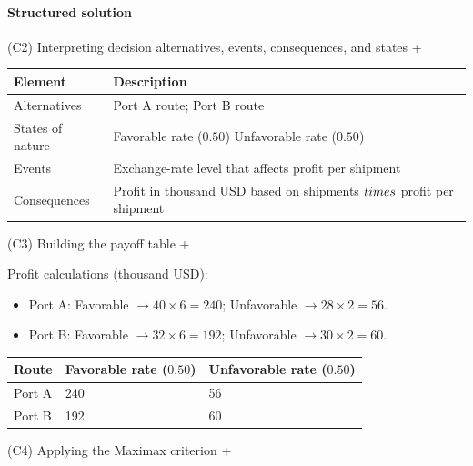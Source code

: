 \documentclass[11pt]{article}
\begin{document}
	\hypertarget{problem6-solution}{}
	
	\paragraph{Structured solution}
	
	
	(C2) Interpreting decision alternatives, events, consequences, and states
	+
	
	
	\begin{center}
		\begin{tabular}{ll}
			\toprule
			Element & Description \\
			\midrule
			Alternatives & Port A route; Port B route \\
			States of nature & Favorable rate
			($0.50$)
			Unfavorable rate
			($0.50$) \\
			Events & Exchange-rate level that affects profit per shipment \\
			Consequences & Profit in thousand USD based on shipments $\\times$ profit per shipment \\
			\bottomrule
		\end{tabular}
	\end{center}
	
	
	
	
	
	
	(C3) Building the payoff table
	+
	
	
	Profit calculations (thousand USD):
	\begin{itemize}
		\item Port A: Favorable $\to 40 \times 6 = 240$; Unfavorable $\to 28 \times 2 = 56$.
		\item Port B: Favorable $\to 32 \times 6 = 192$; Unfavorable $\to 30 \times 2 = 60$.
	\end{itemize}
	
	\begin{center}
		\begin{tabular}{lll}
			\toprule
			Route & Favorable rate
			($0.50$) & Unfavorable rate
			($0.50$) \\
			\midrule
			Port A & 240 & 56 \\
			Port B & 192 & 60 \\
			\bottomrule
		\end{tabular}
	\end{center}
	
	
	
	
	
	
	(C4) Applying the Maximax criterion
	+
	
\end{document}
